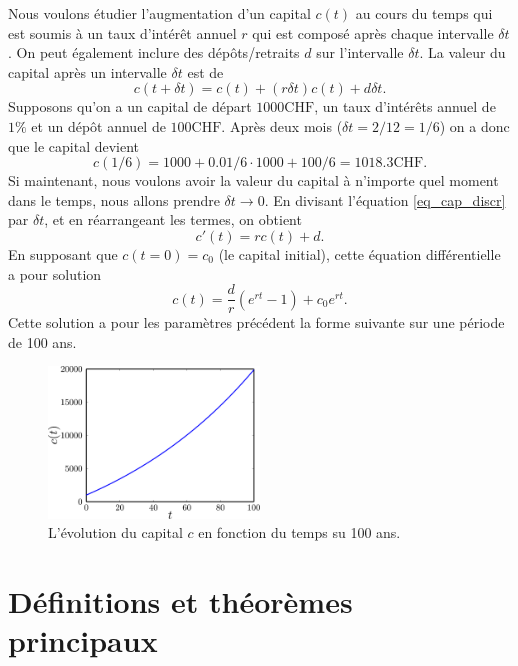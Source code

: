 \documentclass[a4paper,12pt]{book}
\begin{document}
Nous voulons étudier l'augmentation d'un capital $c(t)$ au cours du temps qui est soumis à un 
taux d'intérêt annuel $r$ qui est composé après chaque intervalle $\delta t$. On
peut également inclure des dépôts/retraits $d$ sur l'intervalle $\delta t$.
La valeur du capital après un intervalle $\delta t$ est de
\begin{equation}
 c(t+\delta t)=c(t)+(r\delta t )c(t)+d\delta t.\label{eq_cap_discr}
\end{equation}
Supposons qu'on a un capital de départ $1000 \mathrm{CHF}$, un taux d'intérêts annuel de 
$1\%$ et un dépôt annuel de $100\mathrm{CHF}$. Après deux mois ($\delta t=2/12=1/6$)
on a donc que le capital devient
\begin{equation}
 c(1/6)=1000+0.01/6\cdot 1000 +100/6=1018.3\mathrm{CHF}.
\end{equation}
Si maintenant, nous voulons avoir la valeur du capital à n'importe quel moment dans le
temps, nous allons prendre $\delta t\rightarrow 0$. En divisant l'équation
\eqref{eq_cap_discr} par $\delta t$, et en réarrangeant les termes, on obtient
\begin{equation}
 c'(t)=rc(t)+d.
\end{equation}
En supposant que $c(t=0)=c_0$ (le capital initial), cette équation différentielle a pour solution
\begin{equation}
 c(t)=\frac{d}{r}(e^{rt}-1)+c_0e^{r t}.
\end{equation}
Cette solution a pour les paramètres précédent la forme suivante sur une période de 100 ans.
\begin{figure}[htp]
\begin{center}
\includegraphics[width=0.5\textwidth]{figs/interets.pdf}
\end{center}
\caption{L'évolution du capital $c$ en fonction du temps su 100 ans.}\label{fig_interets}
\end{figure}

\section{Définitions et théorèmes principaux}
\end{document}
